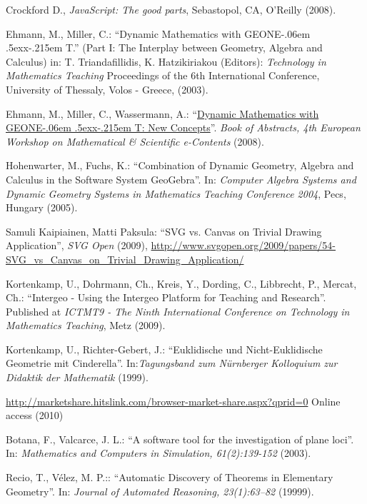 \documentclass[12pt,a4paper]{article}%
\def\GEONExT{GEONE\kern-.06em \lower.5ex\hbox{x}\kern-.215em T}
\begin{document}
\begin{thebibliography}{99}
     Crockford D., \emph{JavaScript: The good parts}, Sebastopol, CA, O'Reilly (2008).
    
     Ehmann, M., Miller, C.: ``Dynamic Mathematics with \GEONExT.''
        (Part I: The Interplay between Geometry, Algebra and Calculus)
        in: T. Triandafillidis, K. Hatzikiriakou (Editors): \emph{Technology in Mathematics Teaching}
        Proceedings of the 6th International Conference, University of Thessaly, Volos - Greece, (2003).
 
     Ehmann, M., Miller, C., Wassermann, A.: 
        ``\href{http://jsxgraph.uni-bayreuth.de/talks/jsxgraphMathematical_and_Scientific_e-Contents.pdf}{Dynamic Mathematics with \GEONExT{}: New Concepts}''. 
        \emph{Book of Abstracts, 4th European Workshop on Mathematical \& Scientific e-Contents}
        (2008).   

     Hohenwarter, M., Fuchs, K.: 
        ``Combination of Dynamic Geometry, Algebra and Calculus in the Software System GeoGebra''.  
        In: \emph{Computer Algebra Systems and Dynamic Geometry Systems in Mathematics Teaching Conference 2004}, 
        Pecs, Hungary (2005).

     Samuli Kaipiainen, Matti Paksula: 
           ``SVG vs. Canvas on Trivial Drawing Application'', \emph{SVG Open} (2009),  
              \href{http://www.svgopen.org/2009/papers/54-SVG_vs_Canvas_on_Trivial_Drawing_Application/}{http://www.svgopen.org/2009/papers/54-SVG\_vs\_Canvas\_on\_Trivial\_Drawing\_Application/}

     Kortenkamp, U., Dohrmann, Ch., Kreis, Y., Dording, C., Libbrecht, P., Mercat, Ch.:
        ``Intergeo - Using the Intergeo Platform for Teaching and Research''. 
            Published at \emph{ICTMT9 - The Ninth International Conference on Technology in Mathematics Teaching},
            Metz (2009).

     Kortenkamp, U., Richter-Gebert, J.: 
        ``Euklidische und Nicht-Euklidische Geometrie mit Cinderella''. 
        In:\emph{Tagungsband zum N\"{u}rnberger Kolloquium zur Didaktik der Mathematik} (1999).
    
    
     \href{http://marketshare.hitslink.com/browser-market-share.aspx?qprid=0}{http://marketshare.hitslink.com/browser-market-share.aspx?qprid=0} Online access (2010)

     Botana, F., Valcarce, J. L.:
        ``A software tool for the investigation of plane loci''.
        In: \emph{Mathematics and Computers in Simulation, 61(2):139-152} (2003).

     Recio, T., V\'elez, M. P.::
        ``Automatic Discovery of Theorems in Elementary Geometry''.
        In: \emph{Journal of Automated Reasoning, 23(1):63–82} (19999).

\end{thebibliography}
\end{document}
